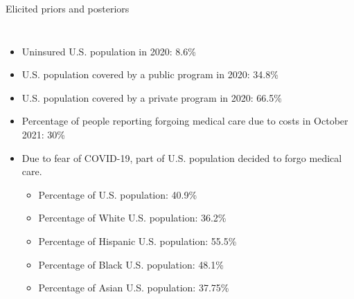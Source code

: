 \documentclass[10pt]{beamer}
\begin{document}
\begin{frame}[fragile]{Elicited priors and posteriors}
\label{facts}
\begin{columns}
    \begin{itemize}
      \item {}Uninsured U.S. population in 2020: 8.6\%
      \item U.S. population covered by a public program in 2020: 34.8\% 
      \item U.S. population covered by a private program in 2020: 66.5\%   
      \item Percentage of people reporting forgoing medical care due to costs in October 2021: 30\% 
      \item Due to fear of COVID-19, part of U.S. population decided to forgo medical care. 
      \begin{itemize}
      \item Percentage of U.S. population: 40.9\%
      \item Percentage of White U.S. population: 36.2\%  
      \item Percentage of Hispanic U.S. population: 55.5\%  
      \item Percentage of Black U.S. population: 48.1\% 
      \item Percentage of Asian U.S. population: 37.75\%  
  \end{itemize}
  \end{itemize}
\end{columns}
  \hfill \hyperlink{Video_info}{}

\end{frame}
\end{document}
